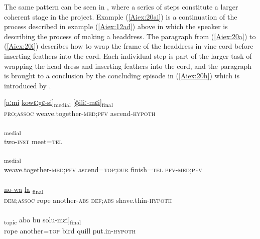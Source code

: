 \documentclass[output=paper]{LSP/langsci}
\begin{document}
	The same pattern can be seen in , where a series of steps constitute a larger coherent stage in the project. Example (\ref{Aiex:20ai}) is a continuation of the process described in example (\ref{Aiex:12ad}) above in which the speaker is describing the process of making a headdress. The paragraph from (\ref{Aiex:20a}) to (\ref{Aiex:20i}) describes how to wrap the frame of the headdress in vine cord before inserting feathers into the cord. Each individual step is part of the larger task of wrapping the head dress and inserting feathers into the cord, and the paragraph is brought to a conclusion by the concluding episode in (\ref{Aiex:20h}) which is introduced by .
	\begin{exe}
\ex \label{Aiex:20ai}
\begin{xlist}
\ex \label{Aiex:20a}
\gll \underline{[aːmi}		\underline{kowɛːgɛ-si]}\textsubscript{medial}	\underline{[ɸiliː-mɛi]}\textsubscript{final}\\
\textsc{pro;assoc}	weave.together\textsc{-med;pfv}	ascend\textsc{-hypoth}\\
\glt {}\\
\ex \label{Aiex:20b}
\gll [aːnɛ-kɛi	ɡo=taː]\textsubscript{medial}\\
two-\textsc{inst}	meet\textsc{=tel}\\
\glt {}\\
\ex \label{Aiex:20c}
\gll	[\textbf{[kowɛːɡɛ-si} \textbf{ɸiliː=jaːː]}\textsubscript{topic}	taːlɛ=taː	di-si]\textsubscript{medial}\\
weave.together\textsc{-med;pfv}	ascend\textsc{=top;dur}		finish\textsc{=tel}	\textsc{pfv-med;pfv}\\
\glt {}\\
\ex \label{Aiex:20d}
\gll \underline{\smash{[aːmi}}	\underline{}	\underline{no-wa}	\underline{la}	\underline{\smash{gaːlɛ-mɛi]}}\textsubscript{final}\\
\textsc{dem;assoc}	rope	another\textsc{-abs}	\textsc{def;abs}	shave.thin\textsc{-hypoth}\\
\glt {}\\
\ex \label{Aiex:20e}
\gll [[mɛgi	no=wa]\textsubscript{topic}	abo	bu	solu-mɛi]\textsubscript{final}\\
rope	another\textsc{=top}	bird	quill	put.in\textsc{-hypoth}\\
\glt {}\\

\end{xlist}
\end{exe}
\end{document}
